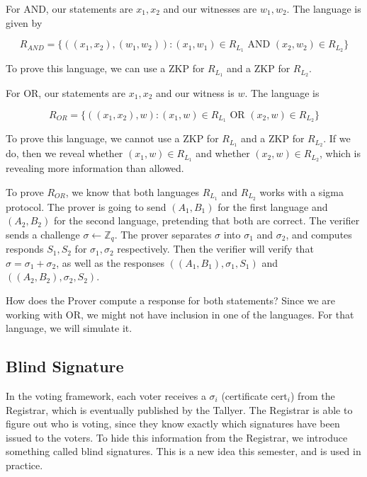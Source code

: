 For AND, our statements are $x_1, x_2$ and our witnesses are $w_1, w_2$. The language is given by

\[ R_{AND} = \{ ((x_1, x_2), (w_1, w_2)): (x_1, w_1) \in R_{L_1} \text{ AND } (x_2, w_2) \in R_{L_2}\}\]

To prove this language, we can use a ZKP for $R_{L_1}$ and a ZKP for $R_{L_2}$.

For OR, our statements are $x_1, x_2$ and our witness is $w$. The language is

\[ R_{OR} = \{ ((x_1, x_2), w): (x_1, w) \in R_{L_1} \text{ OR } (x_2, w) \in R_{L_2}\}\]

To prove this language, we cannot use a ZKP for $R_{L_1}$ and a ZKP for $R_{L_2}$. If we do, then we reveal whether $(x_1, w) \in R_{L_1}$ and whether $(x_2, w) \in R_{L_2}$, which is revealing more information than allowed.

To prove $R_{OR}$, we know that both languages $R_{L_1}$ and $R_{L_2}$ works with a sigma protocol. The prover is going to send $(A_1, B_1)$ for the first language and $(A_2, B_2)$ for the second language, pretending that both are correct. The verifier sends a challenge $\sigma \gets \mathbb{Z}_q$. The prover separates $\sigma$ into $\sigma_1$ and $\sigma_2$, and computes responds $S_1, S_2$ for $\sigma_1, \sigma_2$ respectively. Then the verifier will verify that $\sigma = \sigma_1 + \sigma_2$, as well as the responses $((A_1, B_1), \sigma_1, S_1)$ and $((A_2, B_2), \sigma_2, S_2)$.

How does the Prover compute a response for both statements? Since we are working with OR, we might not have inclusion in one of the languages. For that language, we will simulate it.


\subsection{Blind Signature}

In the voting framework, each voter receives a $\sigma_i$ (certificate $\text{cert}_i$) from the Registrar, which is eventually published by the Tallyer. The Registrar is able to figure out who is voting, since they know exactly which signatures have been issued to the voters. To hide this information from the Registrar, we introduce something called blind signatures. This is a new idea this semester, and is used in practice.


